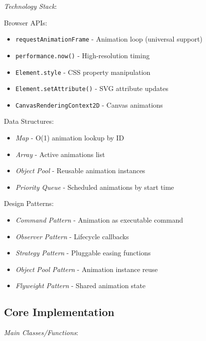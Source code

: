 \documentclass[11pt]{article}
\begin{document}
\emph{Technology Stack}:

Browser APIs:

\begin{itemize}
\item \texttt{requestAnimationFrame} - Animation loop (universal support)
\item \texttt{performance.now()} - High-resolution timing
\item \texttt{Element.style} - CSS property manipulation
\item \texttt{Element.setAttribute()} - SVG attribute updates
\item \texttt{CanvasRenderingContext2D} - Canvas animations
\end{itemize}

Data Structures:

\begin{itemize}
\item \emph{Map} - O(1) animation lookup by ID
\item \emph{Array} - Active animations list
\item \emph{Object Pool} - Reusable animation instances
\item \emph{Priority Queue} - Scheduled animations by start time
\end{itemize}

Design Patterns:

\begin{itemize}
\item \emph{Command Pattern} - Animation as executable command
\item \emph{Observer Pattern} - Lifecycle callbacks
\item \emph{Strategy Pattern} - Pluggable easing functions
\item \emph{Object Pool Pattern} - Animation instance reuse
\item \emph{Flyweight Pattern} - Shared animation state
\end{itemize}
\subsection{Core Implementation}
\label{sec:orgefd5221}

\emph{Main Classes/Functions}:
\end{document}
